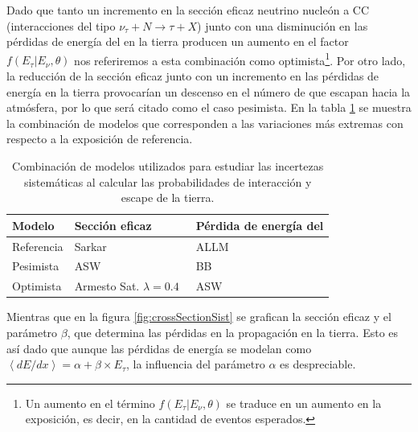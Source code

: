 	Dado que tanto un incremento en la sección eficaz neutrino nucleón a CC (interacciones del tipo $\nu_\tau + N \rightarrow \tau + X$) junto con una disminución en las pérdidas de energía del \tauon{} en la tierra producen un aumento en el factor $f(E_\tau|E_\nu,\theta)$ nos referiremos a esta combinación como optimista\footnote{Un aumento en el término $f(E_\tau|E_\nu,\theta)$ se traduce en un aumento en la exposición, es decir, en la cantidad de eventos esperados.}.
	Por otro lado, la reducción de la sección eficaz junto con un incremento en las pérdidas de energía en la tierra provocarían un descenso en el número de \tauon{} que escapan hacia la atmósfera, por lo que será citado como el caso pesimista.
	En la tabla \ref{tab:esSyst} se muestra la combinación de modelos que corresponden a las variaciones más extremas con respecto a la exposición de referencia.
	\begin{table}[ht!]
	\small
	\begin{center}
		\begin{tabular}{|l|l|l|}
		\hline
		\textbf{Modelo}      & Sección eficaz& Pérdida de energía del \tauon{} \\ 
		\hline
		Referencia &    Sarkar~\cite{cite:cooper_sarkar,cite:cooper_sarkar2}     & ALLM~\cite{cite:Armesto2008,cite:ALLM} \\ 
		Pesimista &  ASW~\cite{cite:Armesto2008,cite:ASW}  &     BB~\cite{bugaev2004propagation} \\ 
		Optimista &   Armesto Sat. $\lambda=0.4$~\cite{cite:Armesto2008}   &  ASW~\cite{cite:Armesto2008,cite:ASW}\\
		\hline 
		\end{tabular}  
	\end{center}
	\caption{
	\label{tab:esSyst}
	Combinación de modelos utilizados para estudiar las incertezas sistemáticas al calcular las probabilidades de interacción y escape de la tierra.
	}
	\end{table}
	Mientras que en la figura \ref{fig:crossSectionSist} se grafican la sección eficaz y el parámetro $\beta$, que determina las pérdidas en la propagación en la tierra. 
	Esto es así dado que aunque las pérdidas de energía se modelan como $\left\langle dE/dx\right\rangle = \alpha + \beta \times E_\tau$, la influencia del parámetro $\alpha$ es despreciable.
